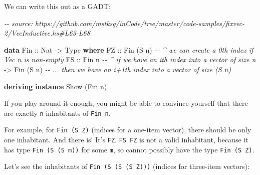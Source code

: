 \documentclass[]{article}
\newenvironment{Shaded}{}{}
\newcommand{\CommentTok}[1]{\textcolor[rgb]{0.38,0.63,0.69}{\textit{#1}}}
\newcommand{\DataTypeTok}[1]{\textcolor[rgb]{0.56,0.13,0.00}{#1}}
\newcommand{\KeywordTok}[1]{\textcolor[rgb]{0.00,0.44,0.13}{\textbf{#1}}}
\newcommand{\NormalTok}[1]{#1}
\newcommand{\OtherTok}[1]{\textcolor[rgb]{0.00,0.44,0.13}{#1}}
\begin{document}
We can write this out as a GADT:

\begin{Shaded}
\begin{Highlighting}[]
\CommentTok{{-}{-} source: https://github.com/mstksg/inCode/tree/master/code{-}samples/fixvec{-}2/VecInductive.hs\#L63{-}L68}

\KeywordTok{data} \DataTypeTok{Fin}\OtherTok{ ::} \DataTypeTok{Nat} \OtherTok{{-}\textgreater{}} \DataTypeTok{Type} \KeywordTok{where}
    \DataTypeTok{FZ}\OtherTok{ ::} \DataTypeTok{Fin}\NormalTok{ (}\DataTypeTok{\textquotesingle{}S}\NormalTok{ n)  }\CommentTok{{-}{-} \^{} we can create a 0th index if Vec n is non{-}empty}
    \DataTypeTok{FS}\OtherTok{ ::} \DataTypeTok{Fin}\NormalTok{ n       }\CommentTok{{-}{-} \^{} if we have an ith index into a vector of size n}
       \OtherTok{{-}\textgreater{}} \DataTypeTok{Fin}\NormalTok{ (}\DataTypeTok{\textquotesingle{}S}\NormalTok{ n)  }\CommentTok{{-}{-} ... then we have an i+1th index into a vector of size (\textquotesingle{}S n)}

\KeywordTok{deriving} \KeywordTok{instance} \DataTypeTok{Show}\NormalTok{ (}\DataTypeTok{Fin}\NormalTok{ n)}
\end{Highlighting}
\end{Shaded}

If you play around it enough, you might be able to convince yourself that there
are exactly \texttt{n} inhabitants of \texttt{Fin\ n}.

For example, for \texttt{Fin\ (\textquotesingle{}S\ \textquotesingle{}Z)}
(indices for a one-item vector), there should be only one inhabitant. And there
is! It's \texttt{FZ}. \texttt{FS\ FZ} is not a valid inhabitant, because it has
type \texttt{Fin\ (\textquotesingle{}S\ (\textquotesingle{}S\ m))} for some
\texttt{m}, so cannot possibly have the type
\texttt{Fin\ (\textquotesingle{}S\ \textquotesingle{}Z)}.

Let's see the inhabitants of
\texttt{Fin\ (\textquotesingle{}S\ (\textquotesingle{}S\ (\textquotesingle{}S\ \textquotesingle{}Z)))}
(indices for three-item vectors):
\end{document}
